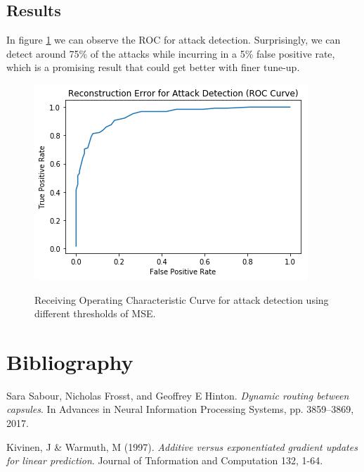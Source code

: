 \documentclass{asaproc}
\begin{document}
\subsection*{Results}

In figure \ref{fig10} we can observe the ROC for attack detection. Surprisingly, we can detect around 75\% of the attacks while incurring in a 5\% false positive rate, which is a promising result that could get better with finer tune-up.

\begin{figure}[h!]
	\centering
	\caption{\enspace Receiving Operating Characteristic Curve for attack detection using different thresholds of MSE.}
	\includegraphics[width=\linewidth]{mse_roc}
	\label{fig10}
\end{figure}

%
%

\section*{Bibliography}

Sara Sabour, Nicholas Frosst, and Geoffrey E Hinton. \textit{Dynamic routing between capsules}. In
Advances in Neural Information Processing Systems, pp. 3859–3869, 2017.

Kivinen, J \& Warmuth, M (1997). \textit{Additive versus exponentiated gradient updates for linear
prediction}. Journal of Tnformation and Computation 132, 1-64. 
\end{document}
